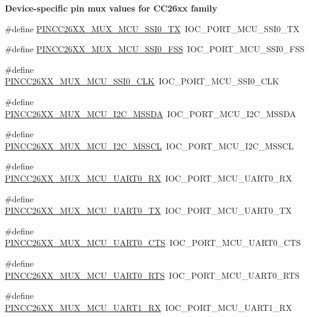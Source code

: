 \begin{Indent}{\bf Device-\/specific pin mux values for C\+C26xx family}
\begin{DoxyCompactItemize}
\item 
\#define \hyperlink{_p_i_n_c_c26_x_x_8h_a330141f9fd840aec1b7c4cabc111363a}{P\+I\+N\+C\+C26\+X\+X\+\_\+\+M\+U\+X\+\_\+\+M\+C\+U\+\_\+\+S\+S\+I0\+\_\+\+T\+X}~I\+O\+C\+\_\+\+P\+O\+R\+T\+\_\+\+M\+C\+U\+\_\+\+S\+S\+I0\+\_\+\+T\+X
\item 
\#define \hyperlink{_p_i_n_c_c26_x_x_8h_a1ac8e06c048c6a1951e11054abcf1c60}{P\+I\+N\+C\+C26\+X\+X\+\_\+\+M\+U\+X\+\_\+\+M\+C\+U\+\_\+\+S\+S\+I0\+\_\+\+F\+S\+S}~I\+O\+C\+\_\+\+P\+O\+R\+T\+\_\+\+M\+C\+U\+\_\+\+S\+S\+I0\+\_\+\+F\+S\+S
\item 
\#define \hyperlink{_p_i_n_c_c26_x_x_8h_a77b7d2034982c09c8c3a75591b226e95}{P\+I\+N\+C\+C26\+X\+X\+\_\+\+M\+U\+X\+\_\+\+M\+C\+U\+\_\+\+S\+S\+I0\+\_\+\+C\+L\+K}~I\+O\+C\+\_\+\+P\+O\+R\+T\+\_\+\+M\+C\+U\+\_\+\+S\+S\+I0\+\_\+\+C\+L\+K
\item 
\#define \hyperlink{_p_i_n_c_c26_x_x_8h_aa3db9a339c53a66396c6fdfde6d6062c}{P\+I\+N\+C\+C26\+X\+X\+\_\+\+M\+U\+X\+\_\+\+M\+C\+U\+\_\+\+I2\+C\+\_\+\+M\+S\+S\+D\+A}~I\+O\+C\+\_\+\+P\+O\+R\+T\+\_\+\+M\+C\+U\+\_\+\+I2\+C\+\_\+\+M\+S\+S\+D\+A
\item 
\#define \hyperlink{_p_i_n_c_c26_x_x_8h_aa617fb5a0aeeda3e4bf7150d5e76a397}{P\+I\+N\+C\+C26\+X\+X\+\_\+\+M\+U\+X\+\_\+\+M\+C\+U\+\_\+\+I2\+C\+\_\+\+M\+S\+S\+C\+L}~I\+O\+C\+\_\+\+P\+O\+R\+T\+\_\+\+M\+C\+U\+\_\+\+I2\+C\+\_\+\+M\+S\+S\+C\+L
\item 
\#define \hyperlink{_p_i_n_c_c26_x_x_8h_ab2932b3af0495872bf444b90cb83d2c0}{P\+I\+N\+C\+C26\+X\+X\+\_\+\+M\+U\+X\+\_\+\+M\+C\+U\+\_\+\+U\+A\+R\+T0\+\_\+\+R\+X}~I\+O\+C\+\_\+\+P\+O\+R\+T\+\_\+\+M\+C\+U\+\_\+\+U\+A\+R\+T0\+\_\+\+R\+X
\item 
\#define \hyperlink{_p_i_n_c_c26_x_x_8h_a5b92514b6f947d9d333927e7f6973677}{P\+I\+N\+C\+C26\+X\+X\+\_\+\+M\+U\+X\+\_\+\+M\+C\+U\+\_\+\+U\+A\+R\+T0\+\_\+\+T\+X}~I\+O\+C\+\_\+\+P\+O\+R\+T\+\_\+\+M\+C\+U\+\_\+\+U\+A\+R\+T0\+\_\+\+T\+X
\item 
\#define \hyperlink{_p_i_n_c_c26_x_x_8h_a522aeda2895c5cb3b0193b2ef3c2d718}{P\+I\+N\+C\+C26\+X\+X\+\_\+\+M\+U\+X\+\_\+\+M\+C\+U\+\_\+\+U\+A\+R\+T0\+\_\+\+C\+T\+S}~I\+O\+C\+\_\+\+P\+O\+R\+T\+\_\+\+M\+C\+U\+\_\+\+U\+A\+R\+T0\+\_\+\+C\+T\+S
\item 
\#define \hyperlink{_p_i_n_c_c26_x_x_8h_a51f1fec524b48909fcfd7f619fb0c008}{P\+I\+N\+C\+C26\+X\+X\+\_\+\+M\+U\+X\+\_\+\+M\+C\+U\+\_\+\+U\+A\+R\+T0\+\_\+\+R\+T\+S}~I\+O\+C\+\_\+\+P\+O\+R\+T\+\_\+\+M\+C\+U\+\_\+\+U\+A\+R\+T0\+\_\+\+R\+T\+S
\item 
\#define \hyperlink{_p_i_n_c_c26_x_x_8h_a6248f1734f57a34106adcd1f1433da80}{P\+I\+N\+C\+C26\+X\+X\+\_\+\+M\+U\+X\+\_\+\+M\+C\+U\+\_\+\+U\+A\+R\+T1\+\_\+\+R\+X}~I\+O\+C\+\_\+\+P\+O\+R\+T\+\_\+\+M\+C\+U\+\_\+\+U\+A\+R\+T1\+\_\+\+R\+X

\end{DoxyCompactItemize}
\end{Indent}

